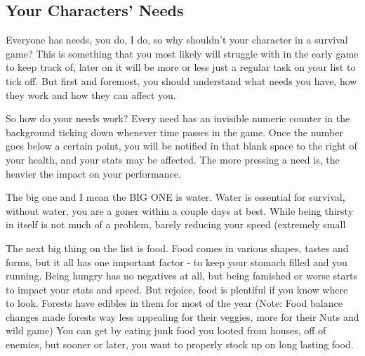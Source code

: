 \documentclass[11pt]{report}
\begin{document}
\subsection{Your Characters' Needs}

Everyone has needs, you do, I do, so why shouldn't your character in a survival game? This is something that you most likely will struggle with in the early game to keep track of, later on it will be more or less just a regular task on your list to tick off. But first and foremost, you should understand what needs you have, how they work and how they can affect you.

So how do your needs work? Every need has an invisible numeric counter in the background ticking down whenever time passes in the game. Once the number goes below a certain point, you will be notified in that blank space to the right of your health, and your stats may be affected. The more pressing a need is, the heavier the impact on your performance.

The big one and I mean the BIG ONE is water. Water is essential for survival, without water, you are a goner within a couple days at best. While being thirsty in itself is not much of a problem, barely reducing your speed (extremely small %

The next big thing on the list is food. Food comes in various shapes, tastes and forms, but it all has one important factor - to keep your stomach filled and you running. Being hungry has no negatives at all, but being famished or worse starts to impact your stats and speed. But rejoice, food is plentiful if you know where to look. Forests have edibles in them for most of the year (Note: Food balance changes made forests way less appealing for their veggies, more for their Nuts and wild game) You can get by eating junk food you looted from houses, off of enemies, but sooner or later, you want to properly stock up on long lasting food.
\end{document}
